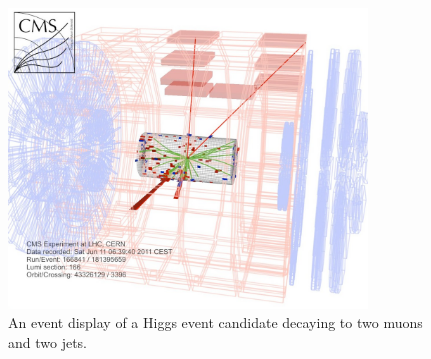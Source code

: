 \begin{figure}[htb]
\begin{center}
\centerline{
\includegraphics[width=0.85\textwidth]{Selection/eventDisplay7TeV.png}
}
\caption{
An event display of a Higgs event candidate decaying to two muons and two jets.~\cite{CMS-PAS-HIG-12-024}
}
\label{fig:event_display}
\end{center}
\end{figure}

